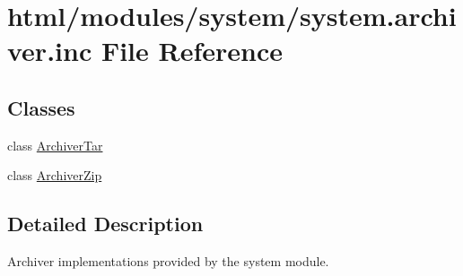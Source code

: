 \hypertarget{system_8archiver_8inc}{
\section{html/modules/system/system.archiver.inc File Reference}
\label{system_8archiver_8inc}
}
\subsection*{Classes}
\begin{DoxyCompactItemize}
\item 
class \hyperlink{classArchiverTar}{ArchiverTar}
\item 
class \hyperlink{classArchiverZip}{ArchiverZip}
\end{DoxyCompactItemize}


\subsection{Detailed Description}
Archiver implementations provided by the system module. 